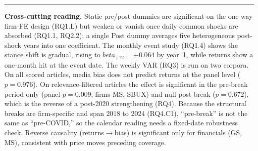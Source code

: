 \documentclass[10pt]{article}
\def\beta{beta}%
\begin{document}

\vspace{0.6em}
\hrule
\vspace{0.4em}

\noindent\textbf{Cross-cutting reading.}
Static pre/post dummies are significant on the one-way firm-FE design (RQ1.L) but weaken or vanish
once daily common shocks are absorbed (RQ1.1, RQ2.2); a single Post dummy averages five
heterogeneous post-shock years into one coefficient. The monthly event study (RQ1.4) shows the
stance shift is gradual, rising to $\beta_{+12}{=}{+}0.064$ by year~1, while returns show a
one-month hit at the event date. The weekly VAR (RQ3) is run on two corpora. On all scored
articles, media bias does not predict returns at the panel level ($p{=}0.976$). On
relevance-filtered articles the effect is significant in the pre-break period only (panel
$p{=}0.009$; firms MS, SBUX) and null post-break ($p{=}0.672$), which is the reverse of a post-2020
strengthening (RQ4). Because the structural breaks are firm-specific and span 2018 to 2024
(RQ4.C1), ``pre-break'' is not the same as ``pre-COVID,'' so the calendar reading needs a
fixed-date robustness check. Reverse causality (returns$\to$bias) is significant only for
financials (GS, MS), consistent with price moves preceding coverage.
\end{document}

